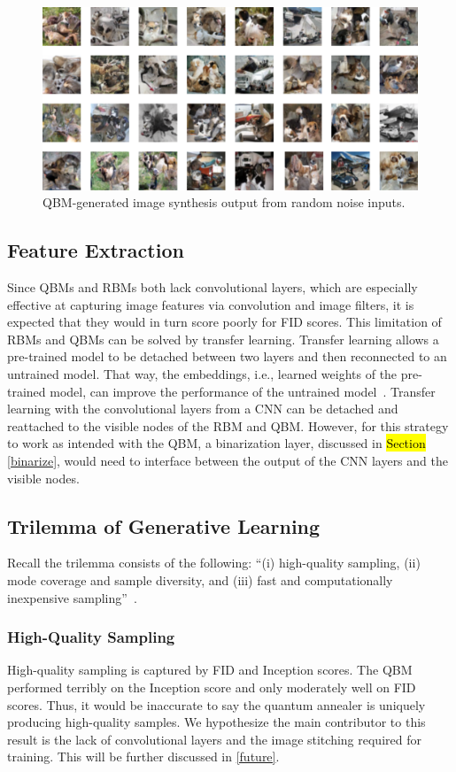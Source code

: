 \documentclass[technologies,article,accept,pdftex,moreauthors]{Definitions/mdpi}
\begin{document}
\begin{figure}[H]
    \includegraphics[width=.99\columnwidth]{qbmout.png}
    \caption{\label{fig:qbmresults}QBM-generated image synthesis output from random noise inputs.}
\end{figure}

\subsection{Feature Extraction}
Since QBMs and RBMs both lack convolutional layers, which are especially effective at capturing image features via convolution and image filters, it is expected that they would in turn score poorly for FID scores. This limitation of RBMs and QBMs can be solved by transfer learning. Transfer learning allows a pre-trained model to be detached between two layers and then reconnected to an untrained model. That way, the embeddings, i.e., learned weights of the pre-trained model, can improve the performance of the untrained model~\cite{transfer}. Transfer learning with the convolutional layers from a CNN can be detached and reattached to the visible nodes of the RBM and QBM. However, for this strategy to work as intended with the QBM, a binarization layer, discussed in \hl{Section} \ref{binarize},  would need to interface between the output of the CNN layers and the visible nodes.


\subsection{Trilemma of Generative Learning}
Recall the trilemma consists of the following: ``(i) high-quality sampling, (ii) mode coverage and sample diversity, and (iii) fast and computationally inexpensive sampling''~\cite{xiao2022DDGAN}.

\subsubsection{High-Quality Sampling}
High-quality sampling is captured by FID and Inception scores. The QBM performed terribly on the Inception score and only moderately well on FID scores. Thus, it would be inaccurate to say the quantum annealer is uniquely producing high-quality samples. We hypothesize the main contributor to this result is the lack of convolutional layers and the image stitching required for training. This will be further discussed in \ref{future}.
\end{document}
